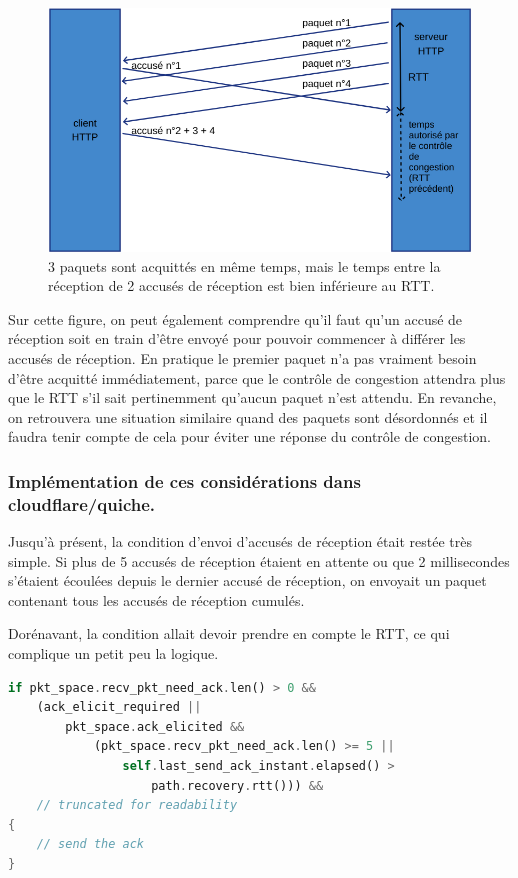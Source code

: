 \begin{figure}[H]
    \centering
    \includegraphics[width=\textwidth]{figures/ack_delayed_before_rtt.png}
    \caption{3 paquets sont acquittés en même temps, mais le temps entre la réception de 2 accusés de réception est bien inférieure au RTT.}
\end{figure}

Sur cette figure, on peut également comprendre qu'il faut qu'un accusé de réception soit en train d'être envoyé pour pouvoir commencer à différer les accusés de réception. En pratique le premier paquet n'a pas vraiment besoin d'être acquitté immédiatement, parce que le contrôle de congestion attendra plus que le RTT s'il sait pertinemment qu'aucun paquet n'est attendu. En revanche, on retrouvera une situation similaire quand des paquets sont désordonnés et il faudra tenir compte de cela pour éviter une réponse du contrôle de congestion.

\subsubsection{Implémentation de ces considérations dans cloudflare/quiche.}

Jusqu'à présent, la condition d'envoi d'accusés de réception était restée très simple.
Si plus de 5 accusés de réception étaient en attente ou que 2 millisecondes s'étaient écoulées depuis le dernier accusé de réception, on envoyait un paquet contenant tous les accusés de réception cumulés.

Dorénavant, la condition allait devoir prendre en compte le RTT, ce qui complique un petit peu la logique.

\begin{center}
    \begin{lstlisting}[language=Rust, caption={Première version de la condition d'envoi d'accusé de réception dépendante du RTT.}]
if pkt_space.recv_pkt_need_ack.len() > 0 &&
    (ack_elicit_required ||
        pkt_space.ack_elicited &&
            (pkt_space.recv_pkt_need_ack.len() >= 5 ||
                self.last_send_ack_instant.elapsed() >
                    path.recovery.rtt())) &&
    // truncated for readability
{
    // send the ack
}
    \end{lstlisting}
\end{center}


